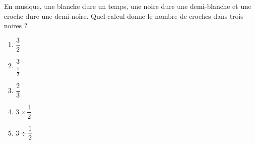 
\begin{exercice}\label{exo2smath-0028}

    En musique, une blanche dure un temps, une noire dure une demi-blanche et une croche dure une demi-noire. Quel calcul donne le nombre de croches dans trois noires ?
    \begin{multicols}{3}
    \begin{enumerate}
        \item
            \( \dfrac{ 3 }{ 2 }\)
        \item
            \( \dfrac{ 3 }{ \frac{ 1 }{2} }\)
        \item
            \( \dfrac{ 2 }{ 3 }\)
        \item
            \( 3\times \dfrac{ 1 }{ 2 }\)
        \item
            \( 3\div \dfrac{ 1 }{ 2 }\)
    \end{enumerate}
    \end{multicols}

\end{exercice}
